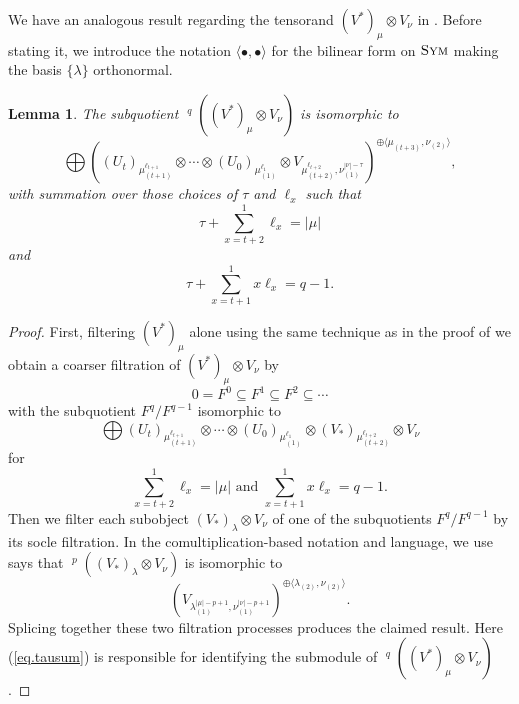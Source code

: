 \documentclass[11pt]{article}
\theoremstyle{plain}
\newtheorem{lemma}{Lemma}[section]
\theoremstyle{nonumberplain}
\theoremstyle{plain}
\theoremstyle{nonumberplain}
\newtheorem{proof}{Proof}
\DeclareMathOperator{\usoc}{\underline{\mathrm{soc}}}
\DeclareMathOperator{\sym}{\cat{Sym}}
\newcommand{\cat}[1]{\textsc{#1}}
\begin{document}
We have an analogous result regarding the tensorand $(V^*)_\mu\otimes V_\nu$ in . Before stating it, we introduce the notation $\langle\bullet,\bullet\rangle$ for the bilinear form on $\sym$ making the basis $\{\lambda\}$ orthonormal. 



\begin{lemma}\label{le.quot_filt'}
  The subquotient  $\usoc^q\left((V^*)_\mu\otimes V_\nu\right)$ is isomorphic to 
  \begin{equation*}
    \bigoplus\left((U_t)_{\mu_{(t+1)}^{\ell_{t+1}}} \otimes\cdots\otimes (U_0)_{\mu_{(1)}^{\ell_1}}\otimes V_{\mu_{(t+2)}^{\ell_{t+2}},\nu_{(1)}^{|\nu|-\tau}}\right)^{\oplus \langle\mu_{(t+3)},\nu_{(2)}\rangle},
  \end{equation*}
with summation over those choices of $\tau$ and $\ell_x$ such that
\begin{equation*}
\tau+\sum^{1}_{x=t+2}\ell_x=|\mu|
\end{equation*}
 and 
 \begin{equation}\label{eq.tausum}
 \tau+\sum^{1}_{x=t+1}x\ell_x=q-1.
\end{equation}
\end{lemma}
\begin{proof}
First, filtering $(V^*)_\mu$ alone using the same
  technique as in the proof of  we
  obtain a coarser filtration of $(V^*)_\mu\otimes V_\nu$ by
  \begin{equation*}
    0=F^0\subseteq F^1\subseteq F^2\subseteq \cdots
  \end{equation*}
  with the subquotient $F^q/F^{q-1}$ isomorphic to
  \begin{equation*}
    \bigoplus (U_t)_{\mu_{(t+1)}^{\ell_{t+1}}}\otimes\cdots\otimes (U_0)_{\mu_{(1)}^{\ell_1}}\otimes (V_*)_{\mu_{(t+2)}^{\ell_{t+2}}}\otimes V_\nu
  \end{equation*}
  for
  \begin{equation*}
    \sum^{1}_{x=t+2} \ell_x = |\mu| \text{ and } \sum^{1}_{x=t+1}x\ell_x=q-1.
  \end{equation*}
  Then we filter each subobject $(V_*)_\lambda\otimes V_\nu$ of
  one of the subquotients $F^q/F^{q-1}$ by its socle filtration.
  In the comultiplication-based notation and language, we use
  \cite[Theorem 2.3]{PS} says that
  $\usoc^p((V_*)_\lambda\otimes V_\nu)$ is isomorphic to
  \begin{equation*}
    \left(V_{\lambda_{(1)}^{|\mu|-p+1},\nu_{(1)}^{|\nu|-p+1}}\right)^{\oplus \langle \lambda_{(2)},\nu_{(2)}\rangle}. 
  \end{equation*}
  Splicing together these two filtration processes produces the
  claimed result.  Here (\ref{eq.tausum}) is responsible for identifying the submodule of $\usoc^q\left((V^*)_\mu\otimes V_\nu\right)$.
%
\end{proof}
\end{document}
